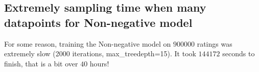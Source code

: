 \documentclass[12pt]{article}
\begin{document}
    \subsection*{Extremely sampling time when many datapoints for Non-negative model}
    For some reason, training the Non-negative model on $900000$ ratings was extremely slow (2000 iterations, max\_treedepth=15). It took $144172$ seconds to finish, that is a bit over $40$ hours! 

% 


\end{document}
